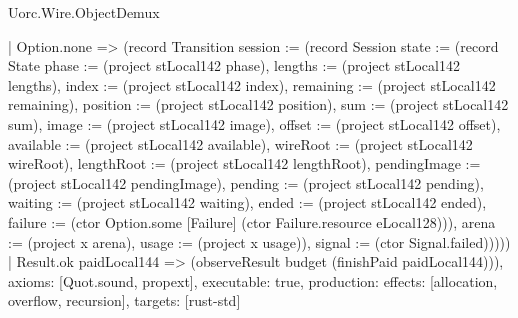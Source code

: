 \begin{lexlean}{Uorc.Wire.ObjectDemux}
\begin{semanticmodule}
{        | Option.none => (record Transition {session := (record Session {state := (record State {phase := (project stLocal142 phase), lengths := (project stLocal142 lengths), index := (project stLocal142 index), remaining := (project stLocal142 remaining), position := (project stLocal142 position), sum := (project stLocal142 sum), image := (project stLocal142 image), offset := (project stLocal142 offset), available := (project stLocal142 available), wireRoot := (project stLocal142 wireRoot), lengthRoot := (project stLocal142 lengthRoot), pendingImage := (project stLocal142 pendingImage), pending := (project stLocal142 pending), waiting := (project stLocal142 waiting), ended := (project stLocal142 ended), failure := (ctor Option.some [Failure] (ctor Failure.resource eLocal128))}), arena := (project x arena), usage := (project x usage)}), signal := (ctor Signal.failed)}))))
    | Result.ok paidLocal144 => (observeResult budget (finishPaid paidLocal144))),
  axioms: [Quot.sound, propext],
  executable: true,
  production: {effects: [allocation, overflow, recursion], targets: [rust-std]}
}


\end{semanticmodule}
\end{lexlean}
